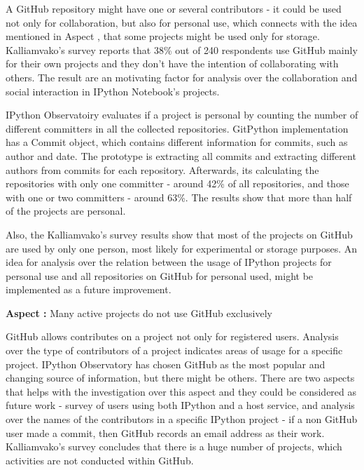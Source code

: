 A GitHub repository might have one or several contributors - it could be used not only for collaboration, but also for personal use, which connects with the idea mentioned in Aspect , that some projects might be used only for storage. Kalliamvako's survey\cite{kalliamvakoupromises} reports that 38\% out of 240 respondents use GitHub mainly for their own projects and they don't have the intention of collaborating with others. The result are an motivating factor for analysis over the collaboration and social interaction in IPython Notebook's projects. 

IPython Observatoiry evaluates if a project is personal by counting the number of different committers in all the collected repositories. GitPython implementation has a Commit object, which contains different information for commits, such as author and date. The prototype is extracting all commits and extracting different authors from commits for each repository. Afterwards, its calculating the repositories with only one committer - around 42\% of all repositories, and those with one or two committers - around 63\%. The results show that more than half of the projects are personal. 

Also, the Kalliamvako's survey\cite{kalliamvakoupromises} results show that most of the projects on GitHub are used by only one person, most likely for experimental or storage purposes. An idea for analysis over the relation between the usage of IPython projects for personal use and all repositories on GitHub for personal used, might be implemented as a future improvement.


\vspace{5mm}
\begin{mdframed}
\vspace{1px}
\textbf{Aspect :}  Many active projects do not use GitHub exclusively
\vspace{1px}
\end{mdframed}
\vspace{2mm}

GitHub allows contributes on a project not only for registered users. Analysis over the type of contributors of a project indicates areas of usage for a specific project. IPython Observatory has chosen GitHub as the most popular and changing source of information, but there might be others. There are two aspects that helps with the investigation over this aspect and they could be considered as future work - survey of users using both IPython and a host service, and analysis over the names of the contributors in a specific IPython project - if a non GitHub user made a commit, then GitHub records an email address as their work\cite{kalliamvakoupromises}. Kalliamvako's survey\cite{kalliamvakoupromises} concludes that there is a huge number of projects, which activities are not conducted within GitHub.

